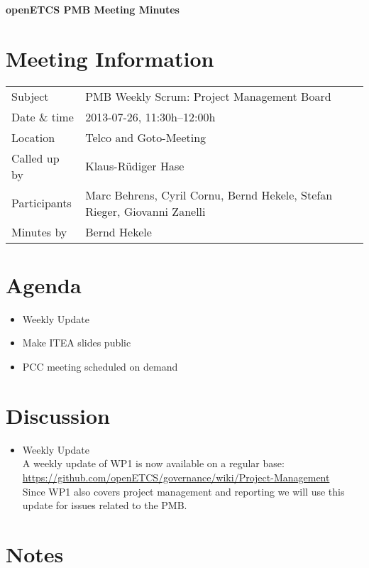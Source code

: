 \documentclass[a4paper, 11pt]{article}
\begin{document}
{\begin{center}\huge\bf openETCS PMB Meeting Minutes\end{center}}
\section{Meeting Information}

\renewcommand{\arraystretch}{1.5}
\begin{supertabular}{m{.2\textwidth}m{.8\textwidth}}
Subject & PMB Weekly Scrum: Project Management Board\\
Date \& time & 2013-07-26, 11:30h--12:00h\\
Location & Telco and Goto-Meeting\\
Called up by & Klaus-R\"udiger Hase\\
Participants &
Marc Behrens,
Cyril Cornu,
Bernd Hekele,
Stefan Rieger,
Giovanni Zanelli
\\

Minutes by & Bernd Hekele\\

\end{supertabular}
\renewcommand{\arraystretch}{1.0}


\section{{Agenda}}
\begin{itemize}
\item Weekly Update\\
\item Make ITEA slides public\\
\item PCC meeting scheduled on demand\\
\end{itemize}

\section{Discussion}
\begin{itemize}
\item Weekly Update\\
A weekly update of WP1 is now available on a regular base: \url{https://github.com/openETCS/governance/wiki/Project-Management}\\
Since WP1 also covers project management and reporting we will use this update for issues related to the PMB. 

\end{itemize}

\section{Notes}
\end{document}
